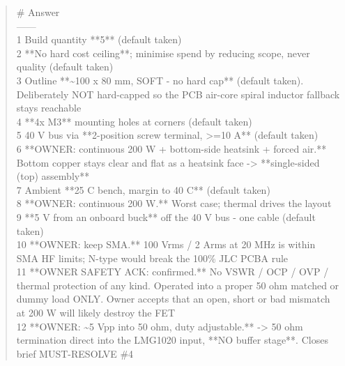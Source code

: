 \documentclass[11pt,a4paper]{article}
\begin{document}
\begin{quote}\small\ttfamily\raggedright
\textbar{} \# \textbar{} Answer \textbar{}\\
\textbar{}---\textbar{}---\textbar{}\\
\textbar{} 1 \textbar{} Build quantity {*}{*}5{*}{*} (default taken) \textbar{}\\
\textbar{} 2 \textbar{} {*}{*}No hard cost ceiling{*}{*}; minimise spend by reducing scope, never quality (default taken) \textbar{}\\
\textbar{} 3 \textbar{} Outline {*}{*}\textasciitilde{}100 x 80 mm, SOFT - no hard cap{*}{*} (default taken). Deliberately NOT hard-capped so the PCB air-core spiral inductor fallback stays reachable \textbar{}\\
\textbar{} 4 \textbar{} {*}{*}4x M3{*}{*} mounting holes at corners (default taken) \textbar{}\\
\textbar{} 5 \textbar{} 40 V bus via {*}{*}2-position screw terminal, \textgreater{}=10 A{*}{*} (default taken) \textbar{}\\
\textbar{} 6 \textbar{} {*}{*}OWNER: continuous 200 W + bottom-side heatsink + forced air.{*}{*} Bottom copper stays clear and flat as a heatsink face -\textgreater{} {*}{*}single-sided (top) assembly{*}{*} \textbar{}\\
\textbar{} 7 \textbar{} Ambient {*}{*}25 C bench, margin to 40 C{*}{*} (default taken) \textbar{}\\
\textbar{} 8 \textbar{} {*}{*}OWNER: continuous 200 W.{*}{*} Worst case; thermal drives the layout \textbar{}\\
\textbar{} 9 \textbar{} {*}{*}5 V from an onboard buck{*}{*} off the 40 V bus - one cable (default taken) \textbar{}\\
\textbar{} 10 \textbar{} {*}{*}OWNER: keep SMA.{*}{*} 100 Vrms / 2 Arms at 20 MHz is within SMA HF limits; N-type would break the 100\% JLC PCBA rule \textbar{}\\
\textbar{} 11 \textbar{} {*}{*}OWNER SAFETY ACK: confirmed.{*}{*} No VSWR / OCP / OVP / thermal protection of any kind. Operated into a proper 50 ohm matched or dummy load ONLY. Owner accepts that an open, short or bad mismatch at 200 W will likely destroy the FET \textbar{}\\
\textbar{} 12 \textbar{} {*}{*}OWNER: \textasciitilde{}5 Vpp into 50 ohm, duty adjustable.{*}{*} -\textgreater{} 50 ohm termination direct into the LMG1020 input, {*}{*}NO buffer stage{*}{*}. Closes brief MUST-RESOLVE \#4 \textbar{}
\end{quote}
\end{document}
